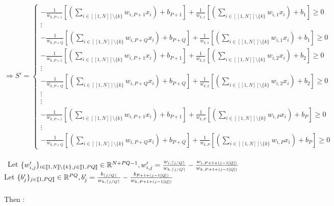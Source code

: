\documentclass{article}
\DeclarePairedDelimiter\ceil{\lceil}{\rceil}
\begin{document}
\begin{appendices}
        \begin{equation*}
            \Rightarrow  S'=
            \begin{cases}
                - \frac{1}{w_{k,P+1}}[(\sum_{i \in [\![1,N]\!] \setminus \lbrace{k}\rbrace}  w_{i,P+1}x_{i}) + b_{P+1}] 
                + \frac{1}{w_{k,1}}[(\sum_{i \in [\![1,N]\!] \setminus \lbrace{k}\rbrace}  w_{i,1}x_{i}) + b_{1}] \geqslant 0
                \\ \vdots 
                \\ - \frac{1}{w_{k,P+Q}}[(\sum_{i \in [\![1,N]\!] \setminus \lbrace{k}\rbrace}  w_{i,P+Q}x_{i}) + b_{P+Q}] 
                 + \frac{1}{w_{k,1}}[(\sum_{i \in [\![1,N]\!] \setminus \lbrace{k}\rbrace}  w_{i,1}x_{i}) + b_{1}] \geqslant 0
                \\- \frac{1}{w_{k,P+1}}[(\sum_{i \in [\![1,N]\!] \setminus \lbrace{k}\rbrace}  w_{i,P+1}x_{i}) + b_{P+1}] 
                + \frac{1}{w_{k,2}}[(\sum_{i \in [\![1,N]\!] \setminus \lbrace{k}\rbrace}  w_{i,2}x_{i}) + b_{2}] \geqslant 0
                \\ \vdots 
                \\ - \frac{1}{w_{k,P+Q}}[(\sum_{i \in [\![1,N]\!] \setminus \lbrace{k}\rbrace}  w_{i,P+Q}x_{i}) + b_{P+Q}] 
                + \frac{1}{w_{k,2}}[(\sum_{i \in [\![1,N]\!] \setminus \lbrace{k}\rbrace}  w_{i,2}x_{i}) + b_{2}] \geqslant 0
                \\ \vdots 
                \\ \vdots 
                \\- \frac{1}{w_{k,P+1}}[(\sum_{i \in [\![1,N]\!] \setminus \lbrace{k}\rbrace}  w_{i,P+1}x_{i}) + b_{P+1}] 
                + \frac{1}{w_{k,P}}[(\sum_{i \in [\![1,N]\!] \setminus \lbrace{k}\rbrace}  w_{i,P}x_{i}) + b_{P}] \geqslant 0
                \\ \vdots 
                \\ - \frac{1}{w_{k,P+Q}}[(\sum_{i \in [\![1,N]\!] \setminus \lbrace{k}\rbrace}  w_{i,P+Q}x_{i}) + b_{P+Q}] 
                + \frac{1}{w_{k,P}}[(\sum_{i \in [\![1,N]\!] \setminus \lbrace{k}\rbrace}  w_{i,P}x_{i}) + b_{P}] \geqslant 0
                
            \end{cases}
            \end{equation*}\\
            \
    Let $\{w'_{i,j}\}_{i \in [\![1,N]\!] \setminus \lbrace{k}\rbrace ,j \in [\![1,PQ]\!]} \in \mathbb{R}^{N+PQ-1},
    w'_{i,j} =  \frac{w_{i,\ceil*{j/Q}}}{w_{k,\ceil*{j/Q}}} - \frac{w_{i,P+1+(j-1[Q])}}{w_{k,P+1+(j-1[Q])}} $\\
    Let $\{b'_{j}\}_{j \in [\![1,PQ]\!]} \in \mathbb{R}^{PQ},  
    b'_{j} =  \frac{b_{\ceil*{j/Q}}}{w_{k,\ceil*{j/Q}}} - \frac{b_{P+1+(j-1[Q])}}{w_{k,P+1+(j-1[Q])}}$\\\\
    Then :


\end{appendices}
\end{document}
